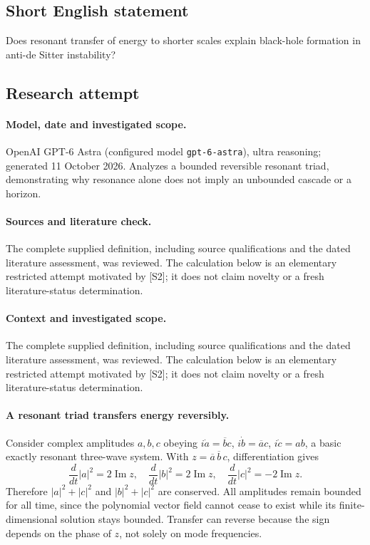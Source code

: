 \documentclass[11pt]{article}
\begin{document}
\subsection{Short English statement}
Does resonant transfer of energy to shorter scales explain black-hole formation in anti-de Sitter instability?
\subsection{Research attempt}
\paragraph{Model, date and investigated scope.}
OpenAI GPT-6 Astra (configured model \texttt{gpt-6-astra}), ultra reasoning; generated 11 October 2026. Analyzes a bounded reversible resonant triad, demonstrating why resonance alone does not imply an unbounded cascade or a horizon.

\paragraph{Sources and literature check.}
The complete supplied definition, including source qualifications and the dated literature assessment, was reviewed. The calculation below is an elementary restricted attempt motivated by [S2]; it does not claim novelty or a fresh literature-status determination.

\paragraph{Context and investigated scope.} The complete supplied definition, including source qualifications and the dated literature assessment, was reviewed. The calculation below is an elementary restricted attempt motivated by [S2]; it does not claim novelty or a fresh literature-status determination.

\paragraph{A resonant triad transfers energy reversibly.} Consider complex amplitudes $a,b,c$ obeying $i\dot a=\overline b c$, $i\dot b=\overline a c$, $i\dot c=ab$, a basic exactly resonant three-wave system. With $z=\overline a\,\overline b\,c$, differentiation gives
\[
 \frac d{dt}|a|^2=2\operatorname{Im}z,\quad
 \frac d{dt}|b|^2=2\operatorname{Im}z,\quad
 \frac d{dt}|c|^2=-2\operatorname{Im}z.
\]
Therefore $|a|^2+|c|^2$ and $|b|^2+|c|^2$ are conserved. All amplitudes remain bounded for all time, since the polynomial vector field cannot cease to exist while its finite-dimensional solution stays bounded. Transfer can reverse because the sign depends on the phase of $z$, not solely on mode frequencies.
\end{document}
